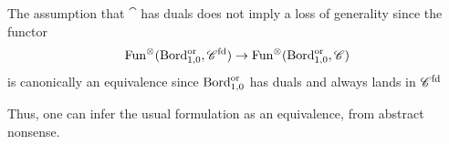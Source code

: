 The assumption that $\cat$ has duals does not imply a loss of generality 
since the functor 
$$\operatorname{Fun}^{\otimes}(\operatorname{Bord}_{1,0}^{\operatorname{or}},\mathscr{C}^{\operatorname{fd}})\to\operatorname{Fun}^{\otimes}(\operatorname{Bord}_{1,0}^{\operatorname{or}},\mathscr{C})$$
is canonically an equivalence since $\operatorname{Bord}_{1,0}^{\operatorname{or}}$ has duals and always lands in
$\mathscr{C}^{\operatorname{fd}}$

Thus, one can infer the usual formulation as an equivalence, from abstract nonsense.
